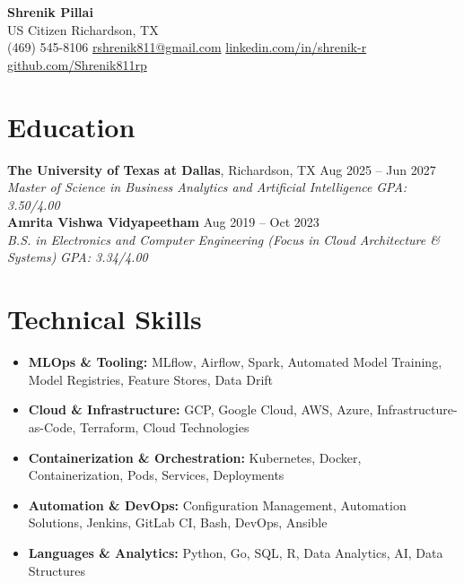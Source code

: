 \documentclass[11pt,letterpaper]{article}
\begin{document}
\begin{center}
{\huge \textbf{Shrenik Pillai}} \\ \vspace{3pt}
US Citizen \textbar{} Richardson, TX \\ \vspace{2pt}
(469) 545-8106 \textbar{} \href{mailto:rshrenik811@gmail.com}{rshrenik811@gmail.com} \textbar{} \href{https://linkedin.com/in/shrenik-r}{linkedin.com/in/shrenik-r} \textbar{} \href{https://github.com/Shrenik811rp}{github.com/Shrenik811rp}
\end{center}
\section*{Education}
\noindent \textbf{The University of Texas at Dallas}, Richardson, TX \hfill Aug 2025 -- Jun 2027 \\
\textit{Master of Science in Business Analytics and Artificial Intelligence} \hfill \textit{GPA: 3.50/4.00} \\
\noindent \textbf{Amrita Vishwa Vidyapeetham} \hfill Aug 2019 -- Oct 2023 \\
\textit{B.S. in Electronics and Computer Engineering (Focus in Cloud Architecture \& Systems)} \hfill \textit{GPA: 3.34/4.00}
\section*{Technical Skills}
\begin{itemize}
\item \textbf{MLOps \& Tooling:} MLflow, Airflow, Spark, Automated Model Training, Model Registries, Feature Stores, Data Drift
\item \textbf{Cloud \& Infrastructure:} GCP, Google Cloud, AWS, Azure, Infrastructure-as-Code, Terraform, Cloud Technologies
\item \textbf{Containerization \& Orchestration:} Kubernetes, Docker, Containerization, Pods, Services, Deployments
\item \textbf{Automation \& DevOps:} Configuration Management, Automation Solutions, Jenkins, GitLab CI, Bash, DevOps, Ansible
\item \textbf{Languages \& Analytics:} Python, Go, SQL, R, Data Analytics, AI, Data Structures
\end{itemize}
\end{document}
